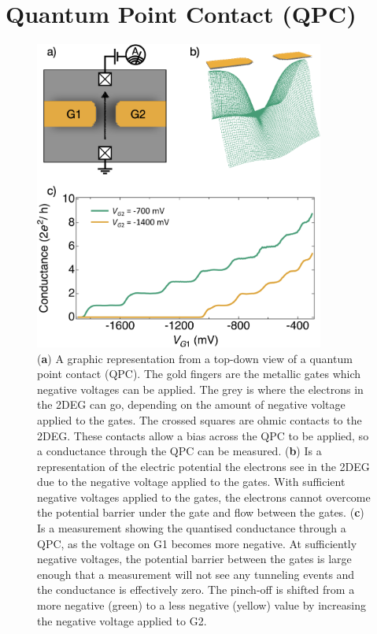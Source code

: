 \afterpage{\clearpage}
\section{Quantum Point Contact (QPC)}

\begin{figure}[!htb]
 \begin{center}
  \includegraphics[width=0.85\textwidth]{figures/ch1/crop_FiguresMaster.003.png}
  \caption[Conductance through a quantum point contact]{\label{fig:ch1/qpc_intro} 
  (\textbf{a}) A graphic representation from a top-down view of a quantum point contact (QPC). The gold fingers are the metallic gates which negative voltages can be applied. The grey is where the electrons in the 2DEG can go, depending on the amount of negative voltage applied to the gates. The crossed squares are ohmic contacts to the 2DEG. These contacts allow a bias across the QPC to be applied, so a conductance through the QPC can be measured. (\textbf{b}) Is a representation of the electric potential the electrons see in the 2DEG due to the negative voltage applied to the gates. With sufficient negative voltages applied to the gates, the electrons cannot overcome the potential barrier under the gate and flow between the gates. (\textbf{c}) Is a measurement showing the quantised conductance through a QPC, as the voltage on G1 becomes more negative. At sufficiently negative voltages, the potential barrier between the gates is large enough that a measurement will not see any tunneling events and the conductance is effectively zero. The pinch-off is shifted from a more negative (green) to a less negative (yellow) value by increasing the negative voltage applied to G2.
   }
 \end{center}
\end{figure}

